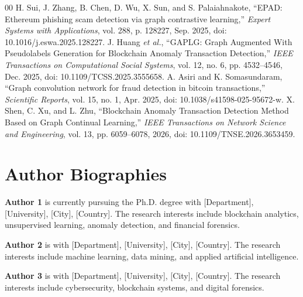 \documentclass{ieeeaccess}
\begin{document}
\begin{thebibliography}{00}
 H. Sui, J. Zhang, B. Chen, D. Wu, X. Sun, and S. Palaiahnakote, ``EPAD: Ethereum phishing scam detection via graph contrastive learning,'' \emph{Expert Systems with Applications}, vol. 288, p. 128227, Sep. 2025, doi: 10.1016/j.eswa.2025.128227.
 J. Huang \emph{et al.}, ``GAPLG: Graph Augmented With Pseudolabels Generation for Blockchain Anomaly Transaction Detection,'' \emph{IEEE Transactions on Computational Social Systems}, vol. 12, no. 6, pp. 4532--4546, Dec. 2025, doi: 10.1109/TCSS.2025.3555658.
 A. Asiri and K. Somasundaram, ``Graph convolution network for fraud detection in bitcoin transactions,'' \emph{Scientific Reports}, vol. 15, no. 1, Apr. 2025, doi: 10.1038/s41598-025-95672-w.
 X. Shen, C. Xu, and L. Zhu, ``Blockchain Anomaly Transaction Detection Method Based on Graph Continual Learning,'' \emph{IEEE Transactions on Network Science and Engineering}, vol. 13, pp. 6059--6078, 2026, doi: 10.1109/TNSE.2026.3653459.
\end{thebibliography}

\section*{Author Biographies}

\noindent\textbf{Author 1} is currently pursuing the Ph.D. degree with [Department], [University], [City], [Country]. The research interests include blockchain analytics, unsupervised learning, anomaly detection, and financial forensics.

\medskip
\noindent\textbf{Author 2} is with [Department], [University], [City], [Country]. The research interests include machine learning, data mining, and applied artificial intelligence.

\medskip
\noindent\textbf{Author 3} is with [Department], [University], [City], [Country]. The research interests include cybersecurity, blockchain systems, and digital forensics.
\end{document}
